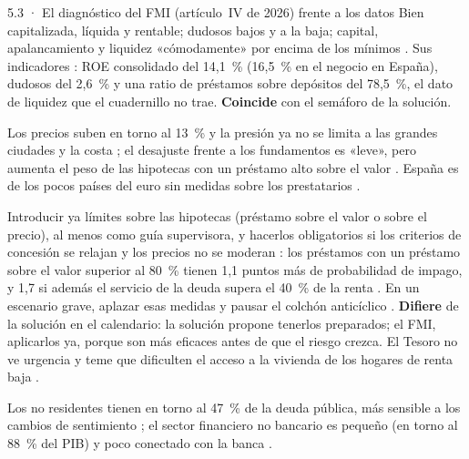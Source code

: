 \begin{complemento}{5.3 · El diagnóstico del FMI (artículo~IV de 2026) frente a los datos}
 Bien capitalizada, líquida y rentable; dudosos bajos y a la baja; capital, apalancamiento y liquidez «cómodamente» por encima de los mínimos . Sus indicadores : ROE consolidado del 14,1~\% (16,5~\% en el negocio en España), dudosos del 2,6~\% y una ratio de préstamos sobre depósitos del 78,5~\%, el dato de liquidez que el cuadernillo no trae. \textbf{Coincide} con el semáforo de la solución.

 Los precios suben en torno al 13~\% y la presión ya no se limita a las grandes ciudades y la costa ; el desajuste frente a los fundamentos es «leve», pero aumenta el peso de las hipotecas con un préstamo alto sobre el valor . España es de los pocos países del euro sin medidas sobre los prestatarios .

 Introducir ya límites sobre las hipotecas (préstamo sobre el valor o sobre el precio), al menos como guía supervisora, y hacerlos obligatorios si los criterios de concesión se relajan y los precios no se moderan : los préstamos con un préstamo sobre el valor superior al 80~\% tienen 1,1 puntos más de probabilidad de impago, y 1,7 si además el servicio de la deuda supera el 40~\% de la renta . En un escenario grave, aplazar esas medidas y pausar el colchón anticíclico . \textbf{Difiere} de la solución en el calendario: la solución propone tenerlos preparados; el FMI, aplicarlos ya, porque son más eficaces antes de que el riesgo crezca. El Tesoro no ve urgencia y teme que dificulten el acceso a la vivienda de los hogares de renta baja .

 Los no residentes tienen en torno al 47~\% de la deuda pública, más sensible a los cambios de sentimiento ; el sector financiero no bancario es pequeño (en torno al 88~\% del PIB) y poco conectado con la banca .
\end{complemento}
